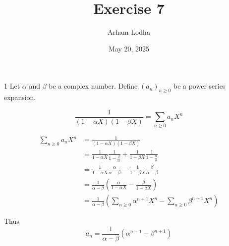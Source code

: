 \documentclass{article}
\begin{document}
\title{Exercise 7}
\author{Arham Lodha}%
\date{May 20, 2025}%
\maketitle

\begin{PROB}{1}\label{Problem 1.}
    Let $\alpha$ and $\beta$ be a complex number. Define $(a_n)_{n \geq 0}$ be a power series expansion. 
    
    \[\frac{1}{(1 - \alpha X)(1 - \beta X)} = \sum_{n \geq 0} a_n X^n\]
\end{PROB}

\begin{align*}
    \sum_{n \geq 0} a_n X^n &= \frac{1}{(1 - \alpha X)(1 - \beta X)}\\
    &= \frac{1}{1 - \alpha X}\frac{1}{1 - \frac{\beta}{\alpha}} + \frac{1}{1 - \beta X}\frac{1}{1 - \frac{\alpha}{\beta}} \\
    &= \frac{1}{1 - \alpha X} \frac{\alpha}{\alpha - \beta} - \frac{1}{1 - \beta X} \frac{\beta}{\alpha - \beta} \\
    &= \frac{1}{\alpha - \beta}\left(\frac{\alpha}{1 - \alpha X} - \frac{\beta}{1 - \beta X}\right) \\
    &= \frac{1}{\alpha - \beta}\left(\sum_{n \geq 0} \alpha^{n + 1} X^n - \sum_{n \geq 0} \beta^{n + 1} X^n \right)
\end{align*} 

Thus \[a_n = \frac{1}{\alpha - \beta}(\alpha^{n + 1} - \beta^{n + 1})\]
\end{document}
